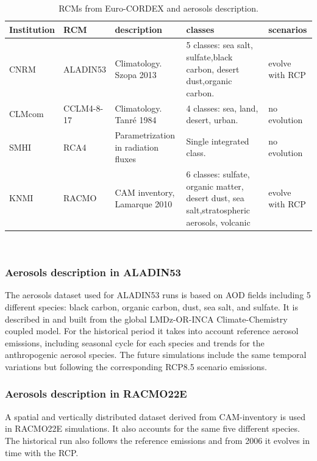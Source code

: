 \begin{table}[h!]
\footnotesize
\begin{tabular}{>{\raggedrigth}m{1.3cm}>{\raggedright}m{1.5cm}|>{\raggedright}m{2.2cm}>{\raggedright}m{2.2cm}>{\raggedright}m{2cm}}
\toprule 
Institution  & RCM & description & classes & scenarios \tabularnewline
\midrule
CNRM & ALADIN53 & Climatology. Szopa 2013 & 5 classes: sea salt, sulfate,black carbon, desert dust,organic carbon.& evolve with RCP \tabularnewline
CLMcom&CCLM4-8-17& Climatology. Tanré 1984 & 4 classes: sea, land, desert, urban.& no evolution\tabularnewline 
SMHI&RCA4& Parametrization in radiation fluxes & Single integrated class.& no evolution \tabularnewline
KNMI&RACMO&CAM inventory, Lamarque 2010 & 6 classes: sulfate, organic matter, desert dust, sea salt,stratospheric aerosols, volcanic & evolve with RCP\tabularnewline
\bottomrule
\end{tabular}\\
\caption[RCMs from Euro-CORDEX and aerosols description]{\label{tb:aero}RCMs from Euro-CORDEX and aerosols description.}
\end{table}
\normalsize

\subsubsection{Aerosols description in ALADIN53}

The aerosols dataset used for ALADIN53 runs is based on AOD fields including 5 different species: black carbon, organic carbon, dust, sea salt, and sulfate. It is described in \cite*{Szopa2013} and built from the global LMDz-OR-INCA Climate-Chemistry coupled model. For the historical period it takes into account reference aerosol emissions, including seasonal cycle for each species and trends for the anthropogenic aerosol species. The future simulations include the same temporal variations but following the corresponding RCP8.5 scenario emissions. 

\subsubsection{Aerosols description in RACMO22E}

A spatial and vertically distributed dataset derived from CAM-inventory \cite*{Lamarque2010} is used in RACMO22E simulations. It also accounts for the same five different species. The historical run also follows the reference emissions \cite*{Lamarque2010} and from 2006 it evolves in time with the RCP.

